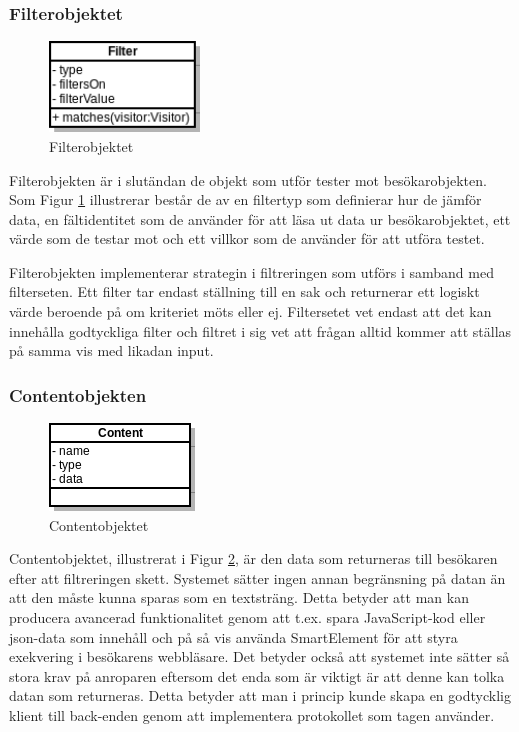\subsubsection{Filterobjektet}

\begin{figure}[h!]
\centering
\includegraphics[width=40mm]{assets/images/umlFilter.png}
\caption{Filterobjektet}
\label{filteruml}
\end{figure}

Filterobjekten är i slutändan de objekt som utför tester mot besökarobjekten. Som Figur \ref{filteruml} illustrerar består de av en filtertyp som definierar hur de jämför data, en fältidentitet som de använder för att läsa ut data ur besökarobjektet, ett värde som de testar mot och ett villkor som de använder för att utföra testet.

Filterobjekten implementerar strategin i filtreringen som utförs i samband med filterseten. Ett filter tar endast ställning till en sak och returnerar ett logiskt värde beroende på om kriteriet möts eller ej. Filtersetet vet endast att det kan innehålla godtyckliga filter och filtret i sig vet att frågan alltid kommer att ställas på samma vis med likadan input.

\subsubsection{Contentobjekten}

\begin{figure}[h!]
\centering
\includegraphics[scale=1]{assets/images/umlContent.png}
\caption{Contentobjektet}
\label{contenttuml}
\end{figure}

Contentobjektet, illustrerat i Figur \ref{contenttuml}, är den data som returneras till besökaren efter att filtreringen skett. Systemet sätter ingen annan begränsning på datan än att den måste kunna sparas som en textsträng. Detta betyder att man kan producera avancerad funktionalitet genom att t.ex. spara JavaScript-kod eller \gls{json}-data som innehåll och på så vis använda SmartElement för att styra exekvering i besökarens webbläsare. Det betyder också att systemet inte sätter så stora krav på anroparen eftersom det enda som är viktigt är att denne kan tolka datan som returneras. Detta betyder att man i princip kunde skapa en godtycklig klient till back-enden genom att implementera protokollet som tagen använder.

